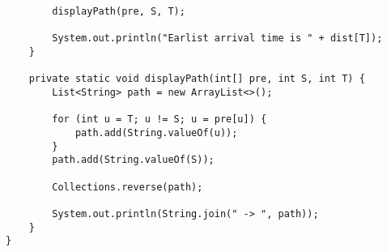 \documentclass[14pt, a4paper]{article}
\begin{document}
\begin{verbatim}
        displayPath(pre, S, T);

        System.out.println("Earlist arrival time is " + dist[T]);
    }

    private static void displayPath(int[] pre, int S, int T) {
        List<String> path = new ArrayList<>();

        for (int u = T; u != S; u = pre[u]) {
            path.add(String.valueOf(u));
        }
        path.add(String.valueOf(S));

        Collections.reverse(path);

        System.out.println(String.join(" -> ", path));
    }
}
\end{verbatim}    
\end{document}
